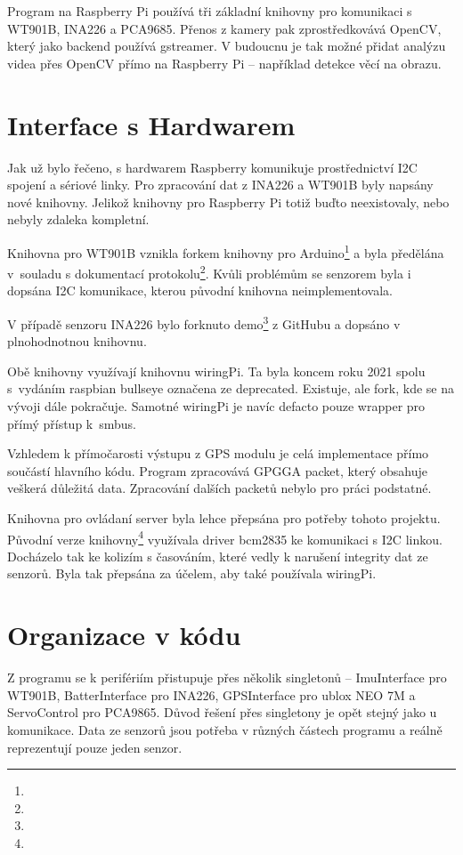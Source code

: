\documentclass[a4paper,oneside,12pt]{report}
\begin{document}
Program na Raspberry Pi používá tři základní knihovny pro komunikaci s WT901B, INA226 a PCA9685.
Přenos z kamery pak zprostředkovává OpenCV, který jako backend používá gstreamer.
V budoucnu je tak možné přidat analýzu videa přes OpenCV přímo na Raspberry Pi -- například detekce věcí na obrazu.

\section{Interface s Hardwarem}

Jak už bylo řečeno, s hardwarem Raspberry komunikuje prostřednictví I2C spojení a sériové linky.
Pro zpracování dat z INA226 a WT901B byly napsány nové knihovny.
Jelikož knihovny pro Raspberry Pi totiž buďto neexistovaly, nebo nebyly zdaleka kompletní.

Knihovna pro WT901B vznikla forkem knihovny pro Arduino\footnote{} a byla předělána v~souladu s dokumentací protokolu\footnote{}.
Kvůli problémům se senzorem byla i dopsána I2C komunikace, kterou původní knihovna neimplementovala.

V případě senzoru INA226 bylo forknuto demo\footnote{} z GitHubu a dopsáno v plnohodnotnou knihovnu.

Obě knihovny využívají knihovnu wiringPi.
Ta byla koncem roku 2021 spolu s~vydáním raspbian bullseye označena ze deprecated.
Existuje, ale fork, kde se na vývoji dále pokračuje.
Samotné wiringPi je navíc defacto pouze wrapper pro přímý přístup k~smbus.

Vzhledem k přímočarosti výstupu z GPS modulu je celá implementace přímo součástí hlavního kódu.
Program zpracovává GPGGA packet, který obsahuje veškerá důležitá data.
Zpracování dalších packetů nebylo pro práci podstatné.

Knihovna pro ovládaní server byla lehce přepsána pro potřeby tohoto projektu.
Původní verze knihovny\footnote{} využívala driver bcm2835 ke komunikaci s I2C linkou.
Docházelo tak ke kolizím s časováním, které vedly k narušení integrity dat ze senzorů.
Byla tak přepsána za účelem, aby také používala wiringPi.

\section{Organizace v kódu}

Z programu se k perifériím přistupuje přes několik singletonů -- ImuInterface pro WT901B, BatterInterface pro INA226, GPSInterface pro ublox NEO 7M a ServoControl pro PCA9865.
Důvod řešení přes singletony je opět stejný jako u komunikace.
Data ze senzorů jsou potřeba v různých částech programu a reálně reprezentují pouze jeden senzor.
\end{document}
